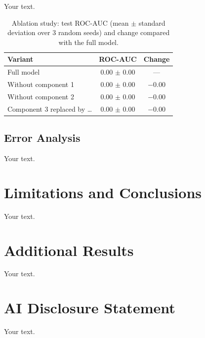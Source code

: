 \documentclass{article}
\begin{document}
Your text.

\begin{table}[t]
  \caption{Ablation study: test ROC-AUC (mean $\pm$ standard deviation over 3 random seeds) and change compared with the full model.}
  \label{tab:ablation}
  \centering
  \begin{tabular}{lcc}
    \toprule
    Variant & ROC-AUC & Change \\
    \midrule
    Full model                    & 0.00 $\pm$ 0.00 & --- \\
    Without component 1           & 0.00 $\pm$ 0.00 & $-0.00$ \\
    Without component 2           & 0.00 $\pm$ 0.00 & $-0.00$ \\
    Component 3 replaced by \ldots & 0.00 $\pm$ 0.00 & $-0.00$ \\
    \bottomrule
  \end{tabular}
\end{table}

\subsection{Error Analysis}

Your text.

\section{Limitations and Conclusions}

Your text.




\appendix

\section{Additional Results}

Your text.

\section{AI Disclosure Statement}

Your text.
\end{document}
